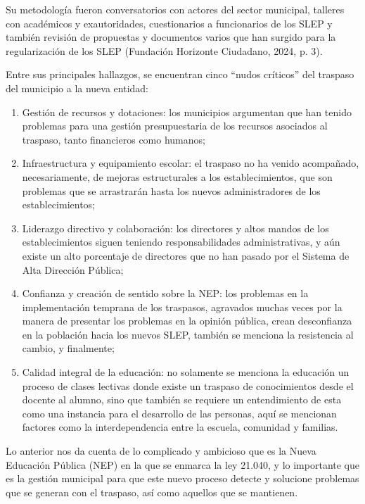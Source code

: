\documentclass[
  12pt,
  letterpaper,
]{article}
\begin{document}
Su metodología fueron conversatorios con actores del sector municipal, talleres con académicos y exautoridades, cuestionarios a funcionarios de los SLEP y también revisión de propuestas y documentos varios que han surgido para la regularización de los SLEP (Fundación Horizonte Ciudadano, 2024, p. 3).

Entre sus principales hallazgos, se encuentran cinco ``nudos críticos'' del traspaso del municipio a la nueva entidad:

\begin{enumerate}
\def\labelenumi{\arabic{enumi}.}
\item
  Gestión de recursos y dotaciones: los municipios argumentan que han tenido problemas para una gestión presupuestaria de los recursos asociados al traspaso, tanto financieros como humanos;
\item
  Infraestructura y equipamiento escolar: el traspaso no ha venido acompañado, necesariamente, de mejoras estructurales a los establecimientos, que son problemas que se arrastrarán hasta los nuevos administradores de los establecimientos;
\item
  Liderazgo directivo y colaboración: los directores y altos mandos de los establecimientos siguen teniendo responsabilidades administrativas, y aún existe un alto porcentaje de directores que no han pasado por el Sistema de Alta Dirección Pública;
\item
  Confianza y creación de sentido sobre la NEP: los problemas en la implementación temprana de los traspasos, agravados muchas veces por la manera de presentar los problemas en la opinión pública, crean desconfianza en la población hacia los nuevos SLEP, también se menciona la resistencia al cambio, y finalmente;
\item
  Calidad integral de la educación: no solamente se menciona la educación un proceso de clases lectivas donde existe un traspaso de conocimientos desde el docente al alumno, sino que también se requiere un entendimiento de esta como una instancia para el desarrollo de las personas, aquí se mencionan factores como la interdependencia entre la escuela, comunidad y familias.
\end{enumerate}

Lo anterior nos da cuenta de lo complicado y ambicioso que es la Nueva Educación Pública (NEP) en la que se enmarca la ley 21.040, y lo importante que es la gestión municipal para que este nuevo proceso detecte y solucione problemas que se generan con el traspaso, así como aquellos que se mantienen.
\end{document}
